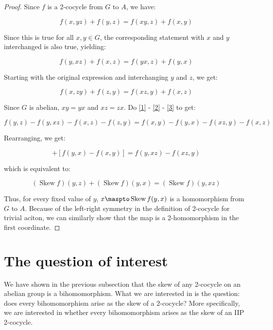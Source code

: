 \documentclass[10pt]{amsart}
\newcommand{\Skew}{\operatorname{Skew}}
\begin{document}
\begin{proof}
  Since $f$ is a 2-cocycle from $G$ to $A$, we have:

  \begin{equation}
    f(x,yz) + f(y,z) = f(xy,z) + f(x,y) \label{1}
  \end{equation}

  Since this is true for all $x,y \in G$, the corresponding statement
  with $x$ and $y$ interchanged is also true, yielding:

  \begin{equation}
    f(y,xz) + f(x,z) = f(yx,z) + f(y,x) \label{2}
  \end{equation}

  Starting with the original expression and interchanging $y$ and $z$,
  we get:

  \begin{equation}
    f(x,zy) + f(z,y) = f(xz,y) + f(x,z) \label{3}
  \end{equation}
  
  Since $G$ is abelian, $xy = yx$ and $xz = zx$. Do \ref{1} - \ref{2}
  - \ref{3} to get:

  \begin{equation*}
    f(y,z) - f(y,xz) - f(x,z) - f(z,y) = f(x,y) - f(y,x) - f(xz,y) - f(x,z)
  \end{equation*}

  Rearranging, we get:

  \begin{equation*}
    [f(y,z) - f(z,y)] + [f(y,x) - f(x,y)] = f(y,xz) - f(xz,y)
  \end{equation*}

  which is equivalent to:

  \begin{equation*}
    (\Skew f)(y,z) + (\Skew f)(y,x) = (\Skew f)(y,xz)
  \end{equation*}

  Thus, for every fixed value of $y$, $x \maspto \Skew f(y,x)$ is a
  homomorphism from $G$ to $A$. Because of the left-right symmetry in
  the definition of 2-cocycle for trivial aciton, we can similarly
  show that the map is a 2-homomorphism in the first coordinate.
\end{proof}

\section{The question of interest}

We have shown in the previous subsection that the skew of any
2-cocycle on an abelian group is a bihomomorphism. What we are
interested in is the question: does every bihomomorphism arise as the
skew of a 2-cocycle? More specifically, we are interested in whether
every bihomomorphism arises as the skew of an IIP 2-cocycle.
\end{document}
